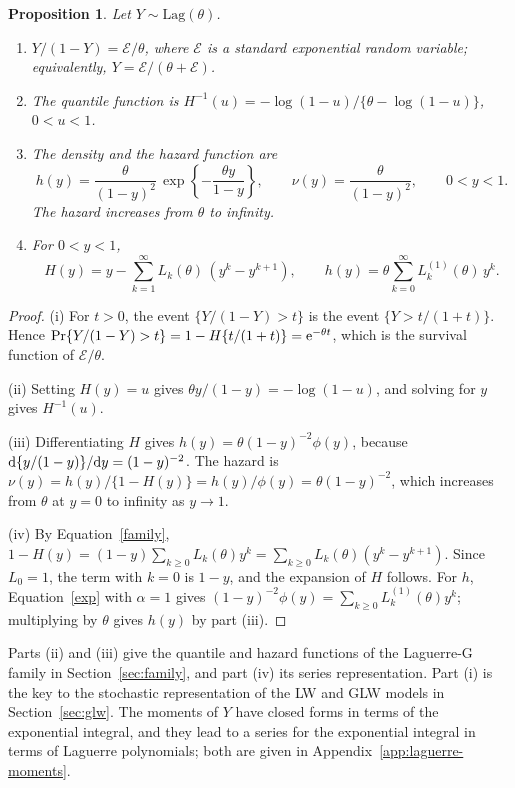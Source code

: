 \documentclass[12pt]{article}
\newcommand{\e}{{\rm e}}         %
\newcommand{\dd}{{\rm d}}        %
\newcommand{\Lag}{\mathrm{Lag}}  %
\newcommand{\Exp}{\mathcal{E}}   %
\newtheorem{proposition}{Proposition}
\begin{document}
\begin{proposition}\label{prop:basic}
Let $Y\sim\Lag(\theta)$.
\begin{enumerate}\renewcommand{\labelenumi}{(\roman{enumi})}
\item $Y/(1-Y)=\Exp/\theta$, where $\Exp$ is a standard exponential random variable; equivalently, $Y=\Exp/(\theta+\Exp)$.
\item The quantile function is $H^{-1}(u)=-\log(1-u)/\{\theta-\log(1-u)\}$, $0<u<1$.
\item The density and the hazard function are
\[
h(y)= \frac{\theta}{(1-y)^2}\, \exp\left\{-\frac{\theta y}{1-y}\right\},
\qquad
\nu(y)= \frac{\theta}{(1-y)^2}, \qquad 0<y<1.
\]
The hazard increases from $\theta$ to infinity.
\item For $0<y<1$,
\[
H(y)=y-\sum^{\infty}_{k=1} L_{k}(\theta) \, (y^k-y^{k+1}),
\qquad
h(y)=\theta\sum_{k=0}^{\infty} L_k^{(1)}(\theta)\, y^k.
\]
\end{enumerate}
\end{proposition}

\begin{proof}
(i) For $t>0$, the event $\{Y/(1-Y)>t\}$ is the event $\{Y>t/(1+t)\}$. Hence $\Pr\{Y/(1-Y)>t\}=1-H\{t/(1+t)\}=\e^{-\theta t}$, which is the survival function of $\Exp/\theta$.

(ii) Setting $H(y)=u$ gives $\theta y/(1-y)=-\log(1-u)$, and solving for $y$ gives $H^{-1}(u)$.

(iii) Differentiating $H$ gives $h(y)=\theta(1-y)^{-2}\phi(y)$, because $\dd\{y/(1-y)\}/\dd y=(1-y)^{-2}$. The hazard is $\nu(y)=h(y)/\{1-H(y)\}=h(y)/\phi(y)=\theta(1-y)^{-2}$, which increases from $\theta$ at $y=0$ to infinity as $y\to1$.

(iv) By Equation~\eqref{family}, $1-H(y)=(1-y)\sum_{k\geq0}L_k(\theta)y^k=\sum_{k\geq0}L_k(\theta)(y^k-y^{k+1})$. Since $L_0=1$, the term with $k=0$ is $1-y$, and the expansion of $H$ follows. For $h$, Equation~\eqref{exp} with $\alpha=1$ gives $(1-y)^{-2}\phi(y)=\sum_{k\geq0}L_k^{(1)}(\theta)y^k$; multiplying by $\theta$ gives $h(y)$ by part (iii).
\end{proof}

Parts (ii) and (iii) give the quantile and hazard functions of the Laguerre-G family in Section~\ref{sec:family}, and part (iv) its series representation. Part (i) is the key to the stochastic representation of the LW and GLW models in Section~\ref{sec:glw}. The moments of $Y$ have closed forms in terms of the exponential integral, and they lead to a series for the exponential integral in terms of Laguerre polynomials; both are given in Appendix~\ref{app:laguerre-moments}.
\end{document}
